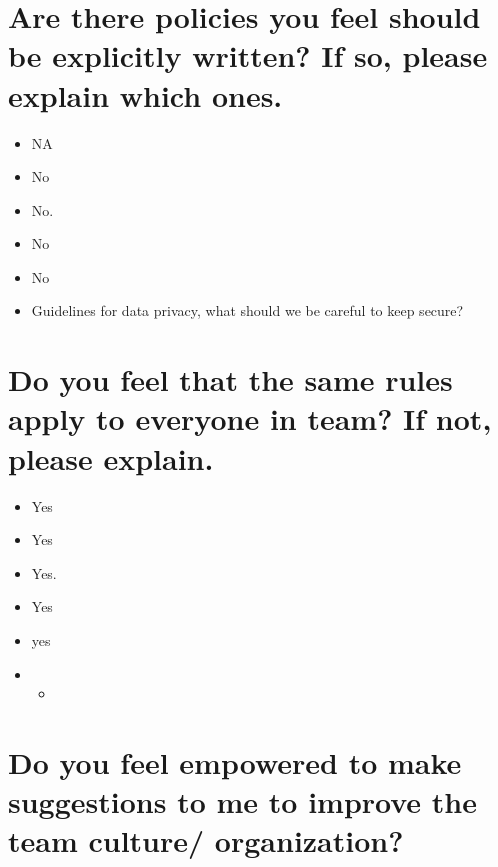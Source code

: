 \documentclass[
]{book}
\providecommand{\tightlist}{%
  \setlength{\itemsep}{0pt}\setlength{\parskip}{0pt}}
\begin{document}
\hypertarget{are-there-policies-you-feel-should-be-explicitly-written-if-so-please-explain-which-ones.-1}{%
\section{Are there policies you feel should be explicitly written? If so, please explain which ones.}\label{are-there-policies-you-feel-should-be-explicitly-written-if-so-please-explain-which-ones.-1}}

\begin{itemize}
\tightlist
\item
  NA
\item
  No
\item
  No.
\item
  No
\item
  No
\item
  Guidelines for data privacy, what should we be careful to keep secure?
\end{itemize}

\hypertarget{do-you-feel-that-the-same-rules-apply-to-everyone-in-team-if-not-please-explain.-1}{%
\section{Do you feel that the same rules apply to everyone in team? If not, please explain.}\label{do-you-feel-that-the-same-rules-apply-to-everyone-in-team-if-not-please-explain.-1}}

\begin{itemize}
\item
  Yes
\item
  Yes
\item
  Yes.
\item
  Yes
\item
  yes
\item
  \begin{itemize}
  \tightlist
  \item
  \end{itemize}
\end{itemize}

\hypertarget{do-you-feel-empowered-to-make-suggestions-to-me-to-improve-the-team-culture-organization-1}{%
\section{Do you feel empowered to make suggestions to me to improve the team culture/ organization?}\label{do-you-feel-empowered-to-make-suggestions-to-me-to-improve-the-team-culture-organization-1}}
\end{document}
